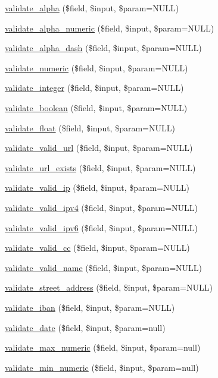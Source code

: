 \begin{DoxyCompactItemize}
\item 
\hyperlink{class_g_u_m_p_ae18d0fcc69a69683098fb268bacce9f1}{validate\-\_\-alpha} (\$field, \$input, \$param=N\-U\-L\-L)
\item 
\hyperlink{class_g_u_m_p_a2c8437ead80cdfaf822d69c899760c56}{validate\-\_\-alpha\-\_\-numeric} (\$field, \$input, \$param=N\-U\-L\-L)
\item 
\hyperlink{class_g_u_m_p_ae2288498543d9fa45bcad7931133f420}{validate\-\_\-alpha\-\_\-dash} (\$field, \$input, \$param=N\-U\-L\-L)
\item 
\hyperlink{class_g_u_m_p_ac294310c0d1f05c47c01e896cb5b7130}{validate\-\_\-numeric} (\$field, \$input, \$param=N\-U\-L\-L)
\item 
\hyperlink{class_g_u_m_p_a093380fa4d38a7b942be48d8b43472ab}{validate\-\_\-integer} (\$field, \$input, \$param=N\-U\-L\-L)
\item 
\hyperlink{class_g_u_m_p_a420118dfbc59681712850e7c293f2fce}{validate\-\_\-boolean} (\$field, \$input, \$param=N\-U\-L\-L)
\item 
\hyperlink{class_g_u_m_p_a9c7ee13511fe8b60e6b7c8e3ab16b4b1}{validate\-\_\-float} (\$field, \$input, \$param=N\-U\-L\-L)
\item 
\hyperlink{class_g_u_m_p_aba0f1c60a73a4f9f242048fe3f3c9859}{validate\-\_\-valid\-\_\-url} (\$field, \$input, \$param=N\-U\-L\-L)
\item 
\hyperlink{class_g_u_m_p_a5fe0a5f166d8868564f95510bfa8af99}{validate\-\_\-url\-\_\-exists} (\$field, \$input, \$param=N\-U\-L\-L)
\item 
\hyperlink{class_g_u_m_p_a46ec7eab7a2de1ee6a4fb2d0e4871e12}{validate\-\_\-valid\-\_\-ip} (\$field, \$input, \$param=N\-U\-L\-L)
\item 
\hyperlink{class_g_u_m_p_a634d833eced310a670e330d83ae21940}{validate\-\_\-valid\-\_\-ipv4} (\$field, \$input, \$param=N\-U\-L\-L)
\item 
\hyperlink{class_g_u_m_p_aa5461994d5742b9b9e2465af704a1fee}{validate\-\_\-valid\-\_\-ipv6} (\$field, \$input, \$param=N\-U\-L\-L)
\item 
\hyperlink{class_g_u_m_p_ab7930d08a9d5494f44c815ad2c1f4cec}{validate\-\_\-valid\-\_\-cc} (\$field, \$input, \$param=N\-U\-L\-L)
\item 
\hyperlink{class_g_u_m_p_a0625128cf72a54300069e498de114c0b}{validate\-\_\-valid\-\_\-name} (\$field, \$input, \$param=N\-U\-L\-L)
\item 
\hyperlink{class_g_u_m_p_aa8f20d01a255ec01907394b07de13560}{validate\-\_\-street\-\_\-address} (\$field, \$input, \$param=N\-U\-L\-L)
\item 
\hyperlink{class_g_u_m_p_afee5d55818fce5886d26847adc4b2d3c}{validate\-\_\-iban} (\$field, \$input, \$param=N\-U\-L\-L)
\item 
\hyperlink{class_g_u_m_p_aab474d17925a66f0ac3a07186dd04cbb}{validate\-\_\-date} (\$field, \$input, \$param=null)
\item 
\hyperlink{class_g_u_m_p_aea65bcdfce3803560ffe8e90461e518d}{validate\-\_\-max\-\_\-numeric} (\$field, \$input, \$param=null)
\item 
\hyperlink{class_g_u_m_p_a53e9a196911a50a1ea5aa70f689d4d19}{validate\-\_\-min\-\_\-numeric} (\$field, \$input, \$param=null)
\end{DoxyCompactItemize}
